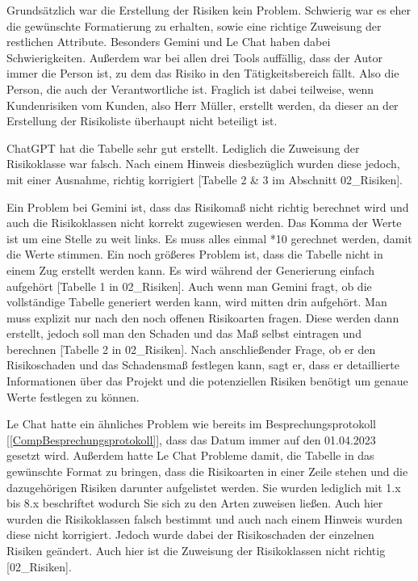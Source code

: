 Grundsätzlich war die Erstellung der Risiken kein Problem. Schwierig war es eher die gewünschte Formatierung zu erhalten, 
sowie eine richtige Zuweisung der restlichen Attribute. Besonders Gemini und Le Chat haben dabei Schwierigkeiten. 
Außerdem war bei allen drei Tools auffällig, dass der Autor immer die Person ist, zu dem das Risiko in den 
Tätigkeitsbereich fällt. Also die Person, die auch der Verantwortliche ist. Fraglich ist dabei teilweise, wenn 
Kundenrisiken vom Kunden, also Herr Müller, erstellt werden, da dieser an der Erstellung der Risikoliste überhaupt 
nicht beteiligt ist.

ChatGPT hat die Tabelle sehr gut erstellt. Lediglich die Zuweisung der Risikoklasse war falsch. Nach einem Hinweis 
diesbezüglich wurden diese jedoch, mit einer Ausnahme, richtig korrigiert [Tabelle 2 \& 3 im Abschnitt 02\_Risiken].

Ein Problem bei Gemini ist, dass das Risikomaß nicht richtig berechnet wird und auch die Risikoklassen nicht korrekt 
zugewiesen werden. Das Komma der Werte ist um eine Stelle zu weit links. Es muss alles einmal *10 gerechnet werden, damit die 
Werte stimmen. Ein noch größeres Problem ist, dass die Tabelle nicht in einem Zug erstellt werden kann. Es wird während der 
Generierung einfach aufgehört [Tabelle 1 in 02\_Risiken]. Auch wenn man Gemini fragt, ob die vollständige Tabelle generiert werden kann, wird mitten 
drin aufgehört. Man muss explizit nur nach den noch offenen Risikoarten fragen. Diese werden dann erstellt, jedoch soll man 
den Schaden und das Maß selbst eintragen und berechnen [Tabelle 2 in 02\_Risiken]. Nach anschließender Frage, ob er den Risikoschaden und das Schadensmaß 
festlegen kann, sagt er, dass er detaillierte Informationen über das Projekt und die potenziellen Risiken benötigt um genaue Werte 
festlegen zu können.

Le Chat hatte ein ähnliches Problem wie bereits im Besprechungsprotokoll [\autoref{CompBesprechungsprotokoll}], dass das 
Datum immer auf den 01.04.2023 gesetzt wird. Außerdem hatte Le Chat Probleme damit, die Tabelle in das gewünschte Format
zu bringen, dass die Risikoarten in einer Zeile stehen und die dazugehörigen Risiken darunter aufgelistet werden. Sie wurden 
lediglich mit 1.x bis 8.x beschriftet wodurch Sie sich zu den Arten zuweisen ließen. Auch 
hier wurden die Risikoklassen falsch bestimmt und auch nach einem Hinweis wurden diese nicht korrigiert. Jedoch wurde 
dabei der Risikoschaden der einzelnen Risiken geändert. Auch hier ist die Zuweisung der Risikoklassen nicht richtig [02\_Risiken].

